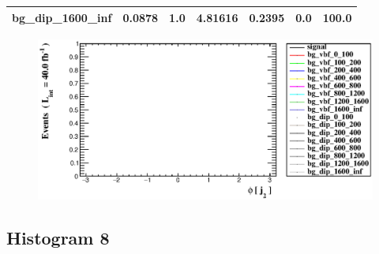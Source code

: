 \documentclass[a4paper, 10pt]{article}
\begin{document}
\begin{table}[H]
\begin{center}
\begin{tabular}{|m{23.0mm}|m{23.0mm}|m{18.0mm}|m{19.0mm}|m{19.0mm}|m{19.0mm}|m{19.0mm}|}
      \hline
      {\cellcolor{white}         bg\_dip\_1600\_inf}& {\cellcolor{white}         0.0878}& {\cellcolor{white}         1.0}& {\cellcolor{white}         4.81616}& {\cellcolor{white}         0.2395}& {\cellcolor{red}         0.0}& {\cellcolor{red}         100.0}\\
\hline
    \end{tabular}
  \end{center}
\end{table}

\begin{figure}[H]
  \begin{center}
    \includegraphics[scale=0.45]{selection_6.eps}\\
\caption{   }
  \end{center}
\end{figure}
      \newpage
\subsection{ Histogram 8}
\end{document}
